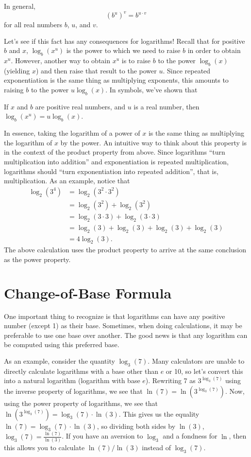 \documentclass[nooutcomes]{ximera}
\begin{document}
In general, $$(b^u)^v = b^{u \cdot v}$$ for all real numbers $b$, $u$, and $v$. 

Let's see if this fact has any consequences for logarithms! Recall that for positive $b$ and $x$, $\log_b(x^u)$ is the power to which we need to raise $b$ in order to obtain $x^u$. However, another way to obtain $x^u$ is to raise $b$ to the power $\log_b(x)$ (yielding $x$) and then raise that result to the power $u$. Since repeated exponentiation is the same thing as multiplying exponents, this amounts to raising $b$ to the power $u\log_b(x)$. In symbols, we've shown that
\begin{callout}
If $x$ and $b$ are positive real numbers, and $u$ is a real number, then $\log_b(x^u) = u \log_b(x)$.
\end{callout}

In essence, taking the logarithm of a power of $x$ is the same thing as multiplying the logarithm of $x$ by the power. An intuitive way to think about this property is in the context of the product property from above. Since logarithms ``turn multiplication into addition'' and exponentiation is repeated multiplication, logarithms should ``turn exponentiation into repeated addition'', that is, multiplication. As an example, notice that 
\begin{align*}
\log_2(3^4) & = \log_2(3^2 \cdot 3^2) \\
& = \log_2(3^2) + \log_2(3^2) \\
& = \log_2(3\cdot 3) + \log_2(3\cdot 3) \\
& = \log_2(3) + \log_2(3) + \log_2(3) + \log_2(3) \\
& = 4\log_2(3).
\end{align*}
The above calculation uses the product property to arrive at the same conclusion as the power property. 

\section{Change-of-Base Formula}
One important thing to recognize is that logarithms can have any positive number (except 1) as their base. Sometimes, when doing calculations, it may be preferable to use one base over another. The good news is that any logarithm can be computed using this preferred base. 

As an example, consider the quantity $\log_3(7)$. Many calculators are unable to directly calculate logarithms with a base other than $e$ or 10, so let's convert this into a natural logarithm (logarithm with base $e$). Rewriting 7 as $3^{\log_3(7)}$ using the inverse property of logarithms, we see that $\ln(7) = \ln(3^{\log_3(7)})$. Now, using the power property of logarithms, we see that $\ln(3^{\log_3(7)}) = \log_3(7)\cdot \ln(3)$. This gives us the equality $\ln(7) = \log_3(7)\cdot \ln(3)$, so dividing both sides by $\ln(3)$, $\log_3(7) = \frac{\ln(7)}{\ln(3)}$. If you have an aversion to $\log_3$ and a fondness for $\ln$, then this allows you to calculate $\ln(7)/\ln(3)$ instead of $\log_3(7)$. 
\end{document}
